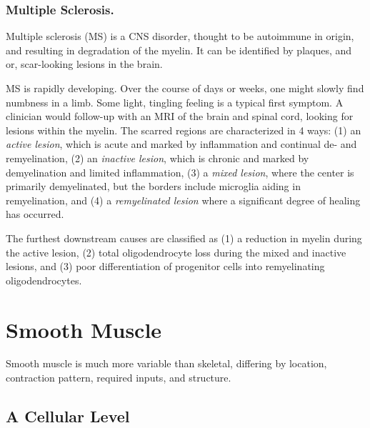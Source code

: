 \subsubsection{Multiple Sclerosis.}

\label{sec:MSdigression}

Multiple sclerosis (MS) is a CNS disorder, thought to be autoimmune in origin, and resulting in degradation of the myelin. It can be identified by plaques, and or, scar-looking lesions in the brain.\newline

MS is rapidly developing. Over the course of days or weeks, one might slowly find numbness in a limb. Some light, tingling feeling is a typical first symptom. A clinician would follow-up with an MRI of the brain and spinal cord, looking for lesions within the myelin. The scarred regions are characterized in 4 ways: (1) an \textit{active lesion}, which is acute and marked by inflammation and continual de- and remyelination, (2) an \textit{inactive lesion}, which is chronic and marked by demyelination and limited inflammation, (3) a \textit{mixed lesion}, where the center is primarily demyelinated, but the borders include microglia aiding in remyelination, and (4) a \textit{remyelinated lesion} where a significant degree of healing has occurred.\newline

The furthest downstream causes are classified as (1) a reduction in myelin during the active lesion, (2) total oligodendrocyte loss during the mixed and inactive lesions, and (3) poor differentiation of progenitor cells into remyelinating oligodendrocytes. 



\section{Smooth Muscle}

Smooth muscle is much more variable than skeletal, differing by location, contraction pattern, required inputs, and structure. 


\subsection{A Cellular Level}
